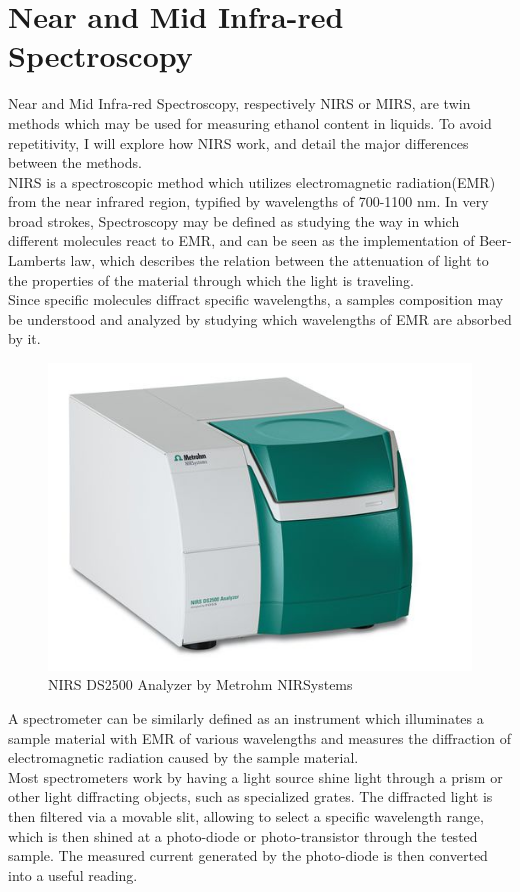 \documentclass[twoside]{ctuthesis}
\theoremstyle{plain}
\theoremstyle{definition}
\theoremstyle{note}
\begin{document}
\section{Near and Mid Infra-red Spectroscopy}
Near and Mid Infra-red Spectroscopy, respectively NIRS or MIRS, are twin methods which may be used for measuring ethanol content in liquids. To avoid repetitivity, I will explore how NIRS work, and detail the major differences between the methods.\\
NIRS is a spectroscopic method which utilizes electromagnetic radiation(EMR) from the near infrared region, typified by wavelengths of 700-1100 nm\cite{NIR_Spectroscopy_Ethanol}. In very broad strokes, Spectroscopy may be defined as studying the way in which different molecules react to EMR, and can be seen as the implementation of Beer-Lamberts law, which describes the relation between the attenuation of light to the properties of the material through which the light is traveling.\\
Since specific molecules diffract specific wavelengths, a samples composition may be understood and analyzed by studying which wavelengths of EMR are absorbed by it.

\begin{figure}[H]
	\centering
	\includegraphics[scale = 0.75]{spectrometer}
	\caption{NIRS DS2500 Analyzer by Metrohm NIRSystems}
\end{figure}

A spectrometer can be similarly defined as an instrument which illuminates a sample material with EMR of various wavelengths and measures the diffraction of electromagnetic radiation caused by the sample material.\\
Most spectrometers work by having a light source shine light through a prism or other light diffracting objects, such as specialized grates. The diffracted light is then filtered via a movable slit, allowing to select a specific wavelength range, which is then shined at a photo-diode or photo-transistor through the tested sample. The measured current generated by the photo-diode is then converted into a useful reading.
\end{document}
